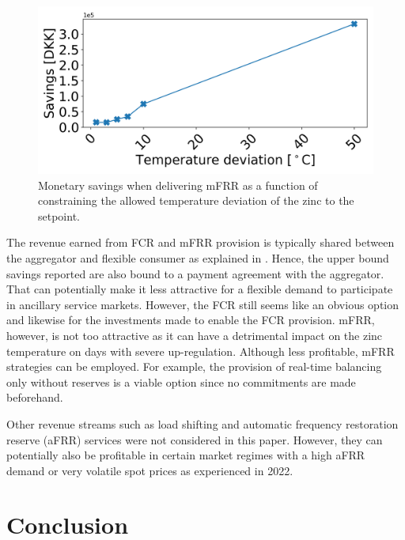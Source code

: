 \documentclass[conference]{IEEEtran}
\begin{document}
\begin{figure}[t]
    \centering
    \includegraphics[width=\columnwidth]{../figures/profit_vs_delta_temp_mfrr_and_energy.png}
    \caption{Monetary savings when delivering mFRR as a function of constraining the allowed temperature deviation of the zinc to the setpoint.}
    \label{fig:profit_vs_delta_temp_mfrr}
\end{figure}


The revenue earned from FCR and mFRR provision is typically shared between the aggregator and flexible consumer as explained in \cite{gade2022ecosystem}. Hence, the upper bound savings reported are also bound to a payment agreement with the aggregator. That can potentially make it less attractive for a flexible demand to participate in ancillary service markets. However, the FCR still seems like an obvious option and likewise for the investments made to enable the FCR provision. mFRR, however, is not too attractive as it can have a detrimental impact on the zinc temperature on days with severe up-regulation. Although less profitable, mFRR strategies can be employed. For example, the provision of real-time balancing only without reserves is a viable option since no commitments are made beforehand.

Other revenue streams such as load shifting and automatic frequency restoration reserve (aFRR) services were not considered in this paper. However, they can potentially also be profitable in certain market regimes with a high aFRR demand or very volatile spot prices as experienced in 2022.

\section{Conclusion}
\end{document}
